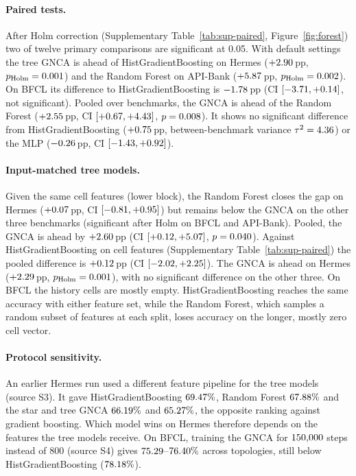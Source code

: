 \documentclass[10pt]{article}
\begin{document}
\paragraph{Paired tests.} After Holm correction (Supplementary Table~\ref{tab:sup-paired}, Figure~\ref{fig:forest}) two of twelve primary comparisons are significant at 0.05. With default settings the tree GNCA is ahead of HistGradientBoosting on Hermes ($+2.90$\,pp, $p_{\text{Holm}}=0.001$) and the Random Forest on API-Bank ($+5.87$\,pp, $p_{\text{Holm}}=0.002$). On BFCL its difference to HistGradientBoosting is $-1.78$\,pp (CI $[-3.71, +0.14]$, not significant). Pooled over benchmarks, the GNCA is ahead of the Random Forest ($+2.55$\,pp, CI $[+0.67, +4.43]$, $p=0.008$). It shows no significant difference from HistGradientBoosting ($+0.75$\,pp, between-benchmark variance $\tau^2=4.36$) or the MLP ($-0.26$\,pp, CI $[-1.43, +0.92]$).
\paragraph{Input-matched tree models.} Given the same cell features (lower block), the Random Forest closes the gap on Hermes ($+0.07$\,pp, CI $[-0.81, +0.95]$) but remains below the GNCA on the other three benchmarks (significant after Holm on BFCL and API-Bank). Pooled, the GNCA is ahead by $+2.60$\,pp (CI $[+0.12, +5.07]$, $p=0.040$). Against HistGradientBoosting on cell features (Supplementary Table~\ref{tab:sup-paired}) the pooled difference is $+0.12$\,pp (CI $[-2.02, +2.25]$). The GNCA is ahead on Hermes ($+2.29$\,pp, $p_{\text{Holm}}=0.001$), with no significant difference on the other three. On BFCL the history cells are mostly empty. HistGradientBoosting reaches the same accuracy with either feature set, while the Random Forest, which samples a random subset of features at each split, loses accuracy on the longer, mostly zero cell vector.
\paragraph{Protocol sensitivity.} An earlier Hermes run used a different feature pipeline for the tree models (source S3). It gave HistGradientBoosting $69.47\%$, Random Forest $67.88\%$ and the star and tree GNCA $66.19\%$ and $65.27\%$, the opposite ranking against gradient boosting. Which model wins on Hermes therefore depends on the features the tree models receive. On BFCL, training the GNCA for $150{,}000$ steps instead of 800 (source S4) gives $75.29$--$76.40\%$ across topologies, still below HistGradientBoosting ($78.18\%$).
\end{document}

